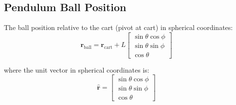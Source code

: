 \documentclass[12pt]{article}
\begin{document}
\subsection{Pendulum Ball Position}

The ball position relative to the cart (pivot at cart) in spherical coordinates:
\begin{equation}
    \mathbf{r}_{\text{ball}} = \mathbf{r}_{\text{cart}} + L
    \begin{bmatrix}
        \sin\theta\cos\phi \\
        \sin\theta\sin\phi \\
        \cos\theta
    \end{bmatrix}
\end{equation}

where the unit vector in spherical coordinates is:
\begin{equation}
    \hat{\mathbf{r}} = 
    \begin{bmatrix}
        \sin\theta\cos\phi \\
        \sin\theta\sin\phi \\
        \cos\theta
    \end{bmatrix}
\end{equation}
\end{document}

